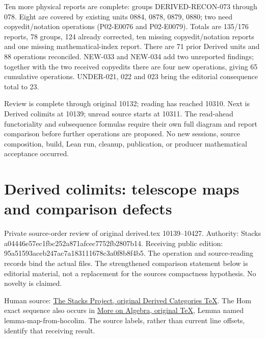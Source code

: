 \documentclass[11pt]{article}
\begin{document}
Ten more physical reports are complete:\allowbreak{} groups DERIVED-RECON-073 through 078. Eight are covered by existing units 0884,\allowbreak{} 0878,\allowbreak{} 0879,\allowbreak{} 0880; two need copyedit/\allowbreak{}notation operations (P02-E0076 and P02-E0079)\allowbreak{}. Totals are 135/\allowbreak{}176 reports,\allowbreak{} 78 groups,\allowbreak{} 124 already corrected,\allowbreak{} ten missing copyedit/\allowbreak{}notation reports and one missing mathematical-index report. There are 71 prior Derived units and 88 operations reconciled. NEW-033 and NEW-034 add two unreported findings; together with the two received copyedits there are four new operations,\allowbreak{} giving 65 cumulative operations. UNDER-021,\allowbreak{} 022 and 023 bring the editorial consequence total to 23.

Review is complete through original 10132; reading has reached 10310. Next is Derived colimits at 10139; unread source starts at 10311. The read-ahead functoriality and subsequence formulas require their own full diagram and report comparison before further operations are proposed. No new sessions,\allowbreak{} source composition,\allowbreak{} build,\allowbreak{} Lean run,\allowbreak{} cleanup,\allowbreak{} publication,\allowbreak{} or producer mathematical acceptance occurred.
\clearpage
\section{\texorpdfstring{Derived colimits:\allowbreak{} telescope maps and comparison defects}{Derived  telescope maps and comparison defects}}\label{proofs-10139-10427-derived-colimits-telescope-maps-and-comparison-defects}

Private source-order review of original derived.tex 10139–\allowbreak{}10427. Authority:\allowbreak{} Stacks a04446e5\allowbreak{}7ec1fbc2\allowbreak{}52a871af\allowbreak{}cec7752f\allowbreak{}b2807b14. Receiving public edition:\allowbreak{} 95a51593\allowbreak{}aceb247a\allowbreak{}c7a18311\allowbreak{}1678c3a0\allowbreak{}f8b8f4b5. The operation and source-reading records bind the actual files. The strengthened comparison statement below is editorial material,\allowbreak{} not a replacement for the source\textquotesingle s compactness hypothesis. No novelty is claimed.

Human source:\allowbreak{} \href{https://github.com/stacks/stacks-project/blob/a04446e57ec1fbc252a871afcec7752fb2807b14/derived.tex\#L10139}{The Stacks Project,\allowbreak{} original Derived Categories TeX}. The Hom exact sequence also occurs in \href{https://github.com/stacks/stacks-project/blob/a04446e57ec1fbc252a871afcec7752fb2807b14/more-algebra.tex}{More on Algebra,\allowbreak{} original TeX},\allowbreak{} Lemma named lemma-map-from-hocolim. The source labels,\allowbreak{} rather than current line offsets,\allowbreak{} identify that receiving result.
\end{document}
